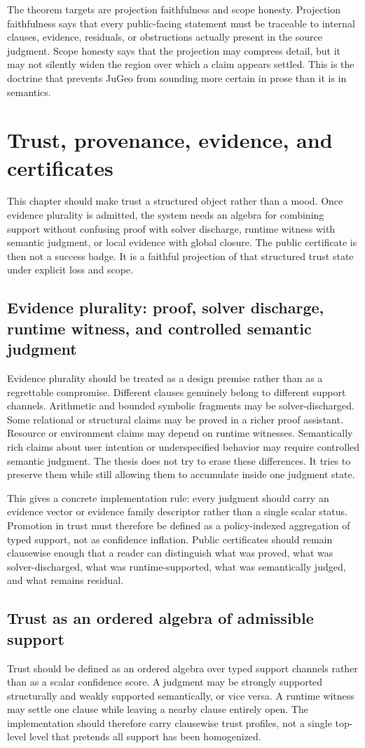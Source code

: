 \documentclass[11pt]{report}
\begin{document}
The theorem targets are projection faithfulness and scope honesty. Projection faithfulness says that every public-facing statement must be traceable to internal clauses, evidence, residuals, or obstructions actually present in the source judgment. Scope honesty says that the projection may compress detail, but it may not silently widen the region over which a claim appears settled. This is the doctrine that prevents JuGeo from sounding more certain in prose than it is in semantics.
\chapter{Trust, provenance, evidence, and certificates}
This chapter should make trust a structured object rather than a mood. Once evidence plurality is admitted, the system needs an algebra for combining support without confusing proof with solver discharge, runtime witness with semantic judgment, or local evidence with global closure. The public certificate is then not a success badge. It is a faithful projection of that structured trust state under explicit loss and scope.
\section{Evidence plurality: proof, solver discharge, runtime witness, and controlled semantic judgment}
Evidence plurality should be treated as a design premise rather than as a regrettable compromise. Different clauses genuinely belong to different support channels. Arithmetic and bounded symbolic fragments may be solver-discharged. Some relational or structural claims may be proved in a richer proof assistant. Resource or environment claims may depend on runtime witnesses. Semantically rich claims about user intention or underspecified behavior may require controlled semantic judgment. The thesis does not try to erase these differences. It tries to preserve them while still allowing them to accumulate inside one judgment state.

This gives a concrete implementation rule: every judgment should carry an evidence vector or evidence family descriptor rather than a single scalar status. Promotion in trust must therefore be defined as a policy-indexed aggregation of typed support, not as confidence inflation. Public certificates should remain clausewise enough that a reader can distinguish what was proved, what was solver-discharged, what was runtime-supported, what was semantically judged, and what remains residual.
\section{Trust as an ordered algebra of admissible support}
Trust should be defined as an ordered algebra over typed support channels rather than as a scalar confidence score. A judgment may be strongly supported structurally and weakly supported semantically, or vice versa. A runtime witness may settle one clause while leaving a nearby clause entirely open. The implementation should therefore carry clausewise trust profiles, not a single top-level level that pretends all support has been homogenized.
\end{document}
